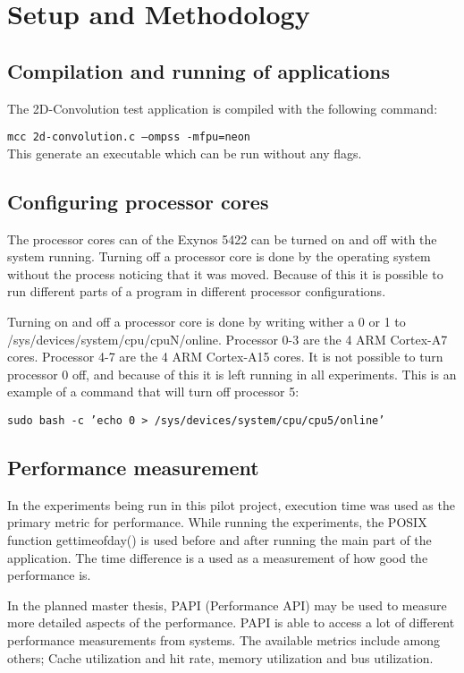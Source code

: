 \chapter[Setup and Methodology]{Setup and Methodology} \label{setupandmethodology}

\section{Compilation and running of applications}
The 2D-Convolution test application is compiled with the following command:

\texttt{mcc 2d-convolution.c --ompss -mfpu=neon}\\
This generate an executable which can be run without any flags.

\section{Configuring processor cores}
The processor cores can of the Exynos 5422 can be turned on and off with the system running.
Turning off a processor core is done by the operating system without the process noticing that it was moved.
Because of this it is possible to run different parts of a program in different processor configurations.

Turning on and off a processor core is done by writing wither a 0 or 1 to /sys/devices/system/cpu/cpuN/online.
Processor 0-3 are the 4 ARM Cortex-A7 cores.
Processor 4-7 are the 4 ARM Cortex-A15 cores.
It is not possible to turn processor 0 off, and because of this it is left running in all experiments.
This is an example of a command that will turn off processor 5:

\texttt{sudo bash -c 'echo 0 > /sys/devices/system/cpu/cpu5/online'}

\section{Performance measurement}
In the experiments being run in this pilot project, execution time was used as the primary metric for performance.
While running the experiments, the POSIX function gettimeofday() is used before and after running the main part of the application.
The time difference is a used as a measurement of how good the performance is.

In the planned master thesis, PAPI (Performance API) may be used to measure more detailed aspects of the performance.
PAPI is able to access a lot of different performance measurements from systems.
The available metrics include among others; Cache utilization and hit rate, memory utilization and bus utilization.

